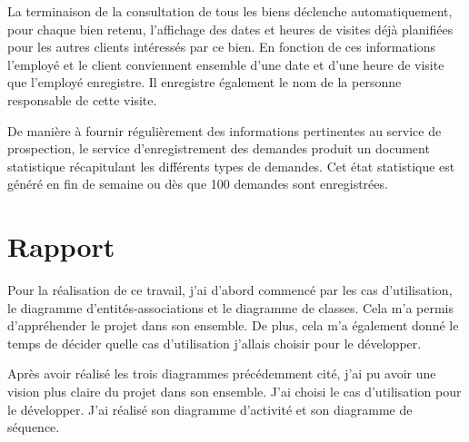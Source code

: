 La terminaison de la consultation de tous les biens déclenche automatiquement, pour chaque bien retenu, l'affichage des dates et heures de visites déjà planifiées pour les autres clients intéressés par ce bien. En fonction de ces informations l'employé et le client conviennent ensemble d'une date et d'une heure de visite que l'employé enregistre. Il enregistre également le nom de la personne responsable de cette visite.

De manière à fournir régulièrement des informations pertinentes au service de prospection, le service d'enregistrement des demandes produit un document statistique récapitulant les différents types de demandes. Cet état statistique est généré en fin de semaine ou dès que 100 demandes sont enregistrées.

\section{Rapport}

Pour la réalisation de ce travail, j'ai d'abord commencé par les cas d'utilisation, le diagramme d'entités-associations et le diagramme de classes. Cela m'a permis d'appréhender le projet dans son ensemble. De plus, cela m'a également donné le temps de décider quelle cas d'utilisation j'allais choisir pour le développer.

Après avoir réalisé les trois diagrammes précédemment cité, j'ai pu avoir une vision plus claire du projet dans son ensemble. J'ai choisi le cas d'utilisation \selectedusecase{} pour le développer. J'ai réalisé son diagramme d'activité et son diagramme de séquence.
